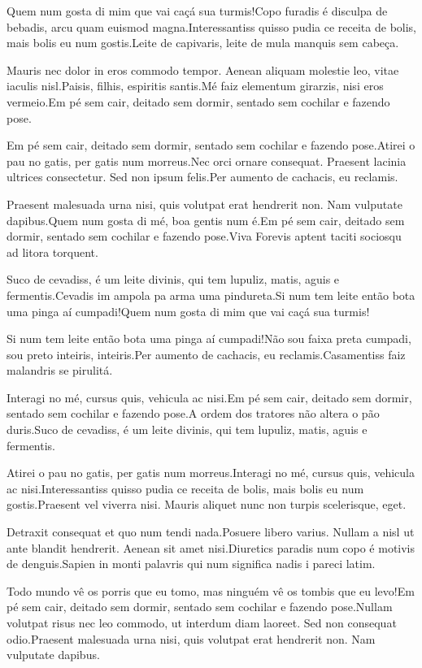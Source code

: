 \documentclass[english]{cenarticle}
\begin{document}
  Quem num gosta di mim que vai caçá sua turmis!Copo furadis é disculpa de bebadis, arcu quam euismod magna.Interessantiss quisso pudia ce receita de bolis, mais bolis eu num gostis.Leite de capivaris, leite de mula manquis sem cabeça.
  
  Mauris nec dolor in eros commodo tempor. Aenean aliquam molestie leo, vitae iaculis nisl.Paisis, filhis, espiritis santis.Mé faiz elementum girarzis, nisi eros vermeio.Em pé sem cair, deitado sem dormir, sentado sem cochilar e fazendo pose.
  
  Em pé sem cair, deitado sem dormir, sentado sem cochilar e fazendo pose.Atirei o pau no gatis, per gatis num morreus.Nec orci ornare consequat. Praesent lacinia ultrices consectetur. Sed non ipsum felis.Per aumento de cachacis, eu reclamis.
  
  Praesent malesuada urna nisi, quis volutpat erat hendrerit non. Nam vulputate dapibus.Quem num gosta di mé, boa gentis num é.Em pé sem cair, deitado sem dormir, sentado sem cochilar e fazendo pose.Viva Forevis aptent taciti sociosqu ad litora torquent.
  
  Suco de cevadiss, é um leite divinis, qui tem lupuliz, matis, aguis e fermentis.Cevadis im ampola pa arma uma pindureta.Si num tem leite então bota uma pinga aí cumpadi!Quem num gosta di mim que vai caçá sua turmis!
  
  Si num tem leite então bota uma pinga aí cumpadi!Não sou faixa preta cumpadi, sou preto inteiris, inteiris.Per aumento de cachacis, eu reclamis.Casamentiss faiz malandris se pirulitá.
  
  Interagi no mé, cursus quis, vehicula ac nisi.Em pé sem cair, deitado sem dormir, sentado sem cochilar e fazendo pose.A ordem dos tratores não altera o pão duris.Suco de cevadiss, é um leite divinis, qui tem lupuliz, matis, aguis e fermentis.
  
  Atirei o pau no gatis, per gatis num morreus.Interagi no mé, cursus quis, vehicula ac nisi.Interessantiss quisso pudia ce receita de bolis, mais bolis eu num gostis.Praesent vel viverra nisi. Mauris aliquet nunc non turpis scelerisque, eget.
  
  Detraxit consequat et quo num tendi nada.Posuere libero varius. Nullam a nisl ut ante blandit hendrerit. Aenean sit amet nisi.Diuretics paradis num copo é motivis de denguis.Sapien in monti palavris qui num significa nadis i pareci latim.
  
  Todo mundo vê os porris que eu tomo, mas ninguém vê os tombis que eu levo!Em pé sem cair, deitado sem dormir, sentado sem cochilar e fazendo pose.Nullam volutpat risus nec leo commodo, ut interdum diam laoreet. Sed non consequat odio.Praesent malesuada urna nisi, quis volutpat erat hendrerit non. Nam vulputate dapibus.
  
\end{document}

